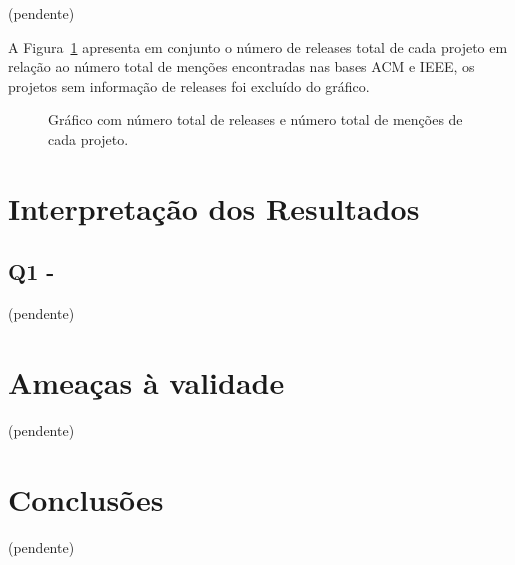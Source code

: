 (pendente)

A Figura~\ref{releases-vs-mentions} apresenta em conjunto o número de releases total
de cada projeto em relação ao número total de menções encontradas nas bases ACM e IEEE,
os projetos sem informação de releases foi excluído do gráfico.

\begin{figure}[h]
  \centering
  \caption{Gráfico com número total de releases e número total de menções de cada projeto.}
  \label{releases-vs-mentions}
\end{figure}


\section{Interpretação dos Resultados} \label{estudo3:interpretacao}

\subsection{Q1 - \EstudoDoisQuestaoUm}

(pendente)

\section{Ameaças à validade}

(pendente)

\section{Conclusões} \label{estudo3:conclusoes}

(pendente)





